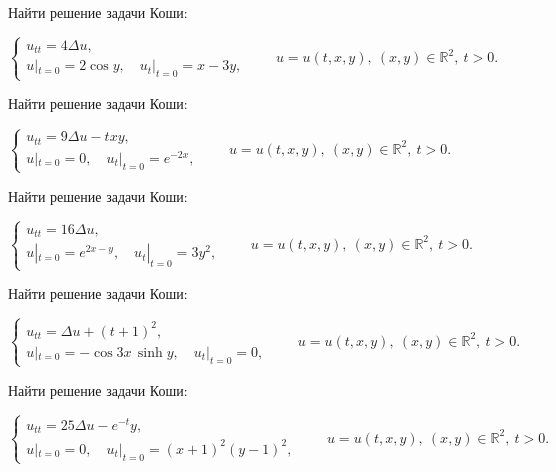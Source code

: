 \begin{cond}
	Найти решение задачи Коши:

	\(
	\begin{cases}
		u_{tt} = 4\Delta u, \\
		u|_{t=0} = 2\cos y,\quad u_t|_{t=0} = x - 3y,
	\end{cases}
	\qquad
	u = u(t,x,y),\ (x,y)\in\mathbb{R}^2,\ t>0.
	\)
\end{cond}


\begin{cond}
	Найти решение задачи Коши:

	\(
	\begin{cases}
		u_{tt} = 9\Delta u - txy, \\
		u|_{t=0} = 0,\quad u_t|_{t=0} = e^{-2x},
	\end{cases}
	\qquad
	u = u(t,x,y),\ (x,y)\in\mathbb{R}^2,\ t>0.
	\)
\end{cond}

\begin{cond}
	Найти решение задачи Коши:

	\(
	\begin{cases}
		u_{tt} = 16\Delta u, \\
		u|_{t=0} = e^{2x - y},\quad u_t|_{t=0} = 3y^2,
	\end{cases}
	\qquad
	u = u(t,x,y),\ (x,y)\in\mathbb{R}^2,\ t>0.
	\)
\end{cond}

\begin{cond}
	Найти решение задачи Коши:

	\(
	\begin{cases}
		u_{tt} = \Delta u + (t+1)^2, \\
		u|_{t=0} = -\cos 3x\,\sinh y,\quad u_t|_{t=0} = 0,
	\end{cases}
	\qquad
	u = u(t,x,y),\ (x,y)\in\mathbb{R}^2,\ t>0.
	\)
\end{cond}

\begin{cond}
	Найти решение задачи Коши:

	\(
	\begin{cases}
		u_{tt} = 25\Delta u - e^{-t}y, \\
		u|_{t=0} = 0,\quad u_t|_{t=0} = (x+1)^2 (y-1)^2,
	\end{cases}
	\qquad
	u = u(t,x,y),\ (x,y)\in\mathbb{R}^2,\ t>0.
	\)
\end{cond}

